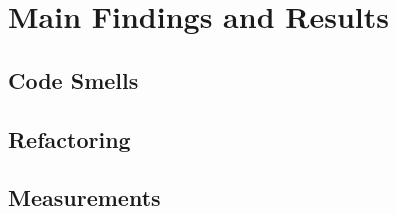 \chapter{Main Findings and Results}

\section{Code Smells}
\section{Refactoring}
\section{Measurements}